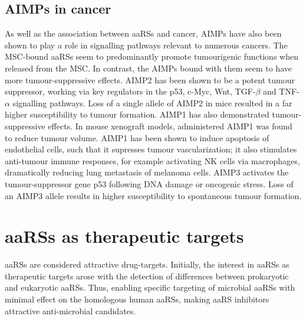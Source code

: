 \subsection{AIMPs in cancer}
As well as the association between aaRSs and cancer, AIMPs have also been shown to play a role in signalling pathways relevant to numerous cancers.
The MSC-bound aaRSs seem to predominantly promote tumourigenic functions when released from the MSC.
In contrast, the AIMPs bound with them seem to have more tumour-suppressive effects.
AIMP2 has been shown to be a potent tumour suppressor, working via key regulators in the p53, c-Myc, Wnt, TGF-$\beta$ and TNF-$\alpha$ signalling pathways.
Loss of a single allele of AIMP2 in mice resulted in a far higher susceptibility to tumour formation\cite{choi2009multidirectional}.
AIMP1 has also demonstrated tumour-suppressive effects.
In mouse xenograft models, administered AIMP1 was found to reduce tumour volume\cite{han2010antitumor, lee2006antitumor}.
AIMP1 has been shown to induce apoptosis of endothelial cells, such that it supresses tumour vascularization\cite{park2002dose}; it also stimulates anti-tumour immune responses, for example activating NK cells via macrophages, dramatically reducing lung metastasis of melanoma cells\cite{kim2017aminoacyl}.
AIMP3 activates the tumour-suppressor gene p53 following DNA damage or oncogenic stress.
Loss of an AIMP3 allele results in higher susceptibility to spontaneous tumour formation\cite{park2005haploinsufficient}.


\section{aaRSs as therapeutic targets}
aaRSs are considered attractive drug-targets.
Initially, the interest in aaRSs as therapeutic targets arose with the detection of differences between prokaryotic and eukaryotic aaRSs.
Thus, enabling specific targeting of microbial aaRSs with minimal effect on the homologous human aaRSs, making aaRS inhibitors attractive anti-microbial candidates.

